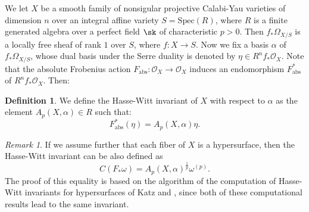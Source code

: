 \documentclass[11pt,leqno]{article}
\theoremstyle{remark}
\newtheorem{rem}{Remark}
\theoremstyle{definition}
\newtheorem{defi}{Definition}
\begin{document}
We let $X$ be a smooth family of nonsigular projective Calabi-Yau varieties of dimension $n$ over an integral affine variety $S = \mathrm{Spec}(R)$, where $R$ is a finite generated algebra over a perfect field $\sk$ of characteristic $p > 0$. Then $f_* \Omega_{X/S}$ is a locally free sheaf of rank $1$ over $S$, where $f: X \to S$. Now we fix a basis $\alpha$ of $f_* \Omega_{X/S}$, whose dual basis under the Serre duality is denoted by $\eta \in R^nf_* \mathcal{O}_X$. Note that the absolute Frobenius action $F_{\mathrm{abs}}: \mathcal{O}_X \to \mathcal{O}_X$ induces an endomorphism $F_{\mathrm{abs}}^*$ of $R^nf_* \mathcal{O}_X$. Then:
\begin{defi}
We define the Hasse-Witt invariant of $X$ with respect to $\alpha$ as the element $A_p(X, \alpha) \in R$ such that:
\[
F_{\mathrm{abs}}^*(\eta) = A_p(X, \alpha) \eta.
\]
\end{defi}
\begin{rem}
If we assume further that each fiber of $X$ is a hypersurface, then the Hasse-Witt invariant can be also defined as 
\[
C(F_* \omega) =  A_p(X, \alpha)^{\frac{1}{p}} \omega^{(p)}.
\]
The proof of this equality is based on the algorithm of the computation of Hasse-Witt invariants for hypersurfaces of Katz \cite[Algorithm 2.3.7.14]{Katz1972} and \cite[Corollary 1]{Miller72}, since both of these computational results lead to the same invariant.
\end{rem}
\end{document}
